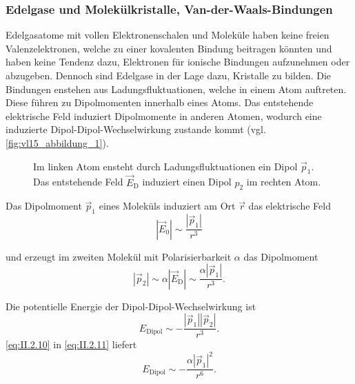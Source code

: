\subsubsection{Edelgase und Molekülkristalle, Van-der-Waals-Bindungen}
	Edelgasatome mit vollen Elektronenschalen und Moleküle haben keine freien Valenzelektronen, welche zu einer kovalenten Bindung beitragen könnten und haben keine Tendenz dazu, Elektronen für ionische Bindungen aufzunehmen oder abzugeben. 
	Dennoch sind Edelgase in der Lage dazu, Kristalle zu bilden.
	Die Bindungen enstehen aus Ladungsfluktuationen, welche in einem Atom auftreten. 
	Diese führen zu Dipolmomenten innerhalb eines Atoms. Das entstehende elektrische Feld induziert Dipolmomente in anderen Atomen, wodurch eine induzierte Dipol-Dipol-Wechselwirkung zustande kommt (vgl. \autoref{fig:vl15_abbildung_1}).\\

	\begin{figure}[H]
		\centering
		\caption{Im linken Atom ensteht durch Ladungsfluktuationen ein Dipol $\vec p_1$. Das entstehende Feld $\vec E_\mathrm D$ induziert einen Dipol $p_2$ im rechten Atom.}
		\label{fig:vl15_abbildung_1}
	\end{figure}

	Das Dipolmoment $\Vec{p}_{1}$ eines Moleküls induziert am Ort $\Vec{r}$ das elektrische Feld
	\begin{equation}
		\label{eq:II.2.9}
		\left| \Vec{E}_{0} \right| \sim \frac{\left| \Vec{p}_{1} \right| }{r^3}
	\end{equation}

	und erzeugt im zweiten Molekül mit Polarisierbarkeit $\alpha$ das Dipolmoment 
	\begin{equation}
		\label{eq:II.2.10}
		\left| \Vec{p}_{2} \right| \sim \alpha \left| \Vec{E}_{\mathrm{D}} \right| \sim \frac{\alpha\left| \Vec{p}_1 \right| }{r^3}.
	\end{equation}

	Die potentielle Energie der Dipol-Dipol-Wechselwirkung ist
	\begin{equation}
		\label{eq:II.2.11}
		E_{\mathrm{Dipol}} \sim - \frac{\left| \Vec{p}_{1}  \right| \left| \Vec{p}_{2} \right| }{r^3}.
	\end{equation}
	\eqref{eq:II.2.10} in \eqref{eq:II.2.11} liefert
	\begin{equation}
		\label{eq:II.2.12}
		E_{\text{Dipol}} \sim - \frac{\alpha \left| \Vec{p}_{1} \right| ^2}{r^{6}}.
	\end{equation}

